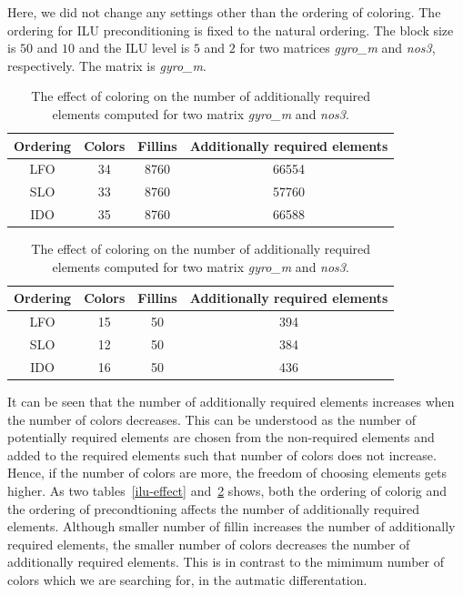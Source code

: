 \documentclass[12pt, oneside]{book}
\begin{document}
Here, we did not change any settings other than the ordering of coloring. The ordering for
ILU preconditioning is fixed to the natural ordering.
The block size is $50$ and $10$ and the ILU level is $5$ and $2$ for two matrices
\textit{gyro\_m} and \textit{nos3}, respectively.
The matrix is \textit{gyro\_m}.
\begin{table}
\begin{tabular}{|c|c|c|c|}
\hline
Ordering & Colors & Fillins & Additionally required elements \\\hline
LFO &  34 & 8760 & 66554 \\\hline
SLO &  33 & 8760 & 57760 \\\hline
IDO &  35 & 8760 & 66588 \\\hline
\end{tabular}
\begin{tabular}{|c|c|c|c|}
Ordering & Colors & Fillins & Additionally required elements \\\hline
LFO &  15 & 50 & 394 \\\hline
SLO &  12 & 50 & 384 \\\hline
IDO &  16 & 50 & 436 \\\hline
\end{tabular}
\caption{The effect of coloring on the number of additionally required elements
computed for two matrix \textit{gyro\_m} and \textit{nos3}. }
\label{col-effect}
\end{table}

It can be seen that the number of additionally required elements increases when 
the number of colors decreases. This can be understood as the number of potentially
required elements are chosen from the non-required elements and added to the required elements
such that number of colors does not increase. Hence, if the number of colors are more,
the freedom of choosing elements gets higher.
As two tables~\ref{ilu-effect} and~\ref{col-effect} shows, 
both the ordering of colorig and the ordering of precondtioning affects the number of
additionally required elements. Although smaller number of fillin increases
the number of additionally required elements, the smaller number of colors 
decreases the number of additionally required elements.
This is in contrast to the mimimum number of colors which we are searching for, 
in the autmatic differentation.

\end{document}
